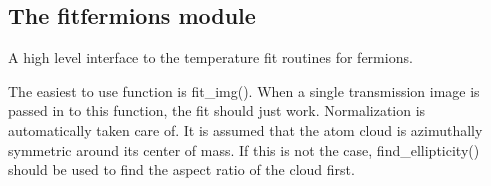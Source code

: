 \documentclass[letterpaper,10pt,english]{manual}
\begin{document}
\subsection{The fitfermions module}
\hypertarget{module-odysseus.fitfermions}{}
\modulesynopsis{}
A high level interface to the temperature fit routines for fermions.

The easiest to use function is fit\_img(). When a single transmission image
is passed in to this function, the fit should just work. Normalization
is automatically taken care of. It is assumed that the atom cloud is
azimuthally symmetric around its center of mass. If this is not the case,
find\_ellipticity() should be used to find the aspect ratio of the cloud first.
\end{document}
